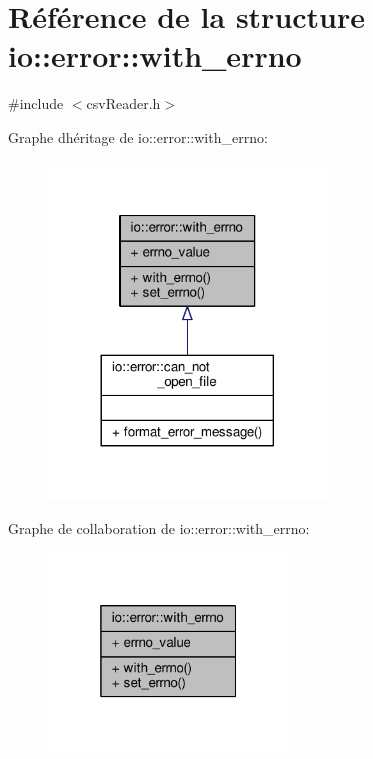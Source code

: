 \hypertarget{structio_1_1error_1_1with__errno}{}\section{Référence de la structure io\+:\+:error\+:\+:with\+\_\+errno}
\label{structio_1_1error_1_1with__errno}


{\ttfamily \#include $<$csv\+Reader.\+h$>$}



Graphe d\textquotesingle{}héritage de io\+:\+:error\+:\+:with\+\_\+errno\+:
\nopagebreak
\begin{figure}[H]
\begin{center}
\leavevmode
\includegraphics[width=209pt]{structio_1_1error_1_1with__errno__inherit__graph}
\end{center}
\end{figure}


Graphe de collaboration de io\+:\+:error\+:\+:with\+\_\+errno\+:
\nopagebreak
\begin{figure}[H]
\begin{center}
\leavevmode
\includegraphics[width=181pt]{structio_1_1error_1_1with__errno__coll__graph}
\end{center}
\end{figure}
